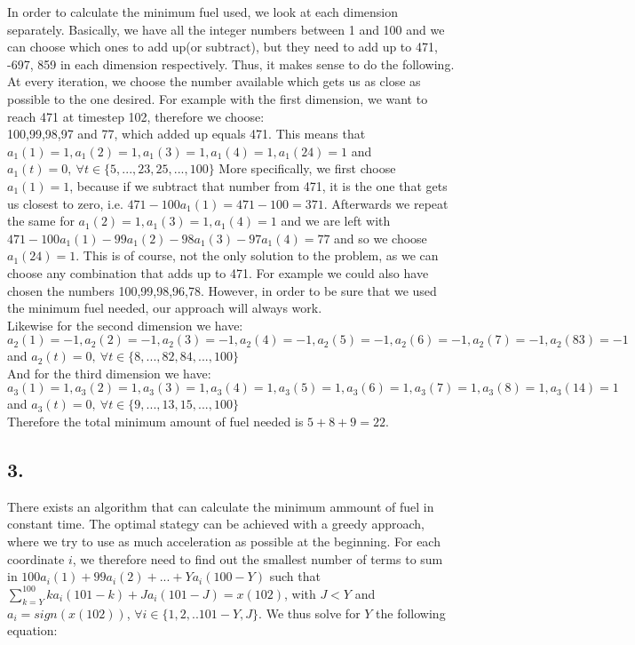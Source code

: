 \documentclass[11pt,a4paper,oneside]{report}
\begin{document}
In order to calculate the minimum fuel used, we look at each dimension separately. Basically, we have all the integer numbers between 1 and 100 and we can choose which ones to add up(or subtract), but they need to add up to 471, -697, 859 in each dimension respectively. Thus, it makes sense to do the following. At every iteration, we choose the number available which gets us as close as possible to the one desired. For example with the first dimension, we want to reach 471 at timestep 102, therefore we choose:\\
100,99,98,97 and 77, which added up equals 471. This means that $a_1(1)=1, a_1(2)=1, a_1(3)=1,a_1(4)=1,a_1(24)=1$ and $a_1(t) = 0,\ \forall t \in \{5,...,23,25,...,100\}$
More specifically, we first choose $a_1(1) = 1$, because if we subtract that number from 471, it is the one that gets us closest to zero, i.e. $471-100a_1(1) = 471-100=371$. Afterwards we repeat the same for $a_1(2)=1, a_1(3)=1,a_1(4)=1$ and we are left with $471-100a_1(1)-99a_1(2)-98a_1(3)-97a_1(4)=77$ and so we choose $a_1(24)=1$. This is of course, not the only solution to the problem, as we can choose any combination that adds up to 471. For example we could also have chosen the numbers 100,99,98,96,78. However, in order to be sure that we used the minimum fuel needed, our approach will always work.\\
Likewise for the second dimension we have:\\
$a_2(1)=-1,a_2(2)=-1,a_2(3)=-1,a_2(4)=-1,a_2(5)=-1,a_2(6)=-1,a_2(7)=-1,a_2(83)=-1$ and $a_2(t)=0,\ \forall t\in \{8,...,82,84,...,100\}$\\
And for the third dimension we have:\\
$a_3(1)=1,a_3(2)=1,a_3(3)=1,a_3(4)=1,a_3(5)=1,a_3(6)=1,a_3(7)=1,a_3(8)=1,a_3(14)=1$ and $a_3(t)=0,\ \forall t\in \{9,...,13,15,...,100\}$\\

Therefore the total minimum amount of fuel needed is $5+8+9=22$.\\

\subsection*{3.}

There exists an algorithm that can calculate the minimum ammount of fuel in constant time. The optimal stategy can be achieved with a greedy approach, where we try to use as much acceleration as possible at the beginning. For each coordinate $i$, we therefore need to find out the smallest number of terms to sum in $100a_i(1)+99a_i(2) + ... + Ya_{i}(100-Y)$ such that $\sum_{k=Y}^{100}ka_{i}(101-k) + Ja_i(101-J) = x(102)$, with $J < Y$ and $a_i = sign(x(102))$, $\forall i \in \{1,2, .. 101-Y, J\}$. We thus solve for $Y$ the following equation:
\end{document}
